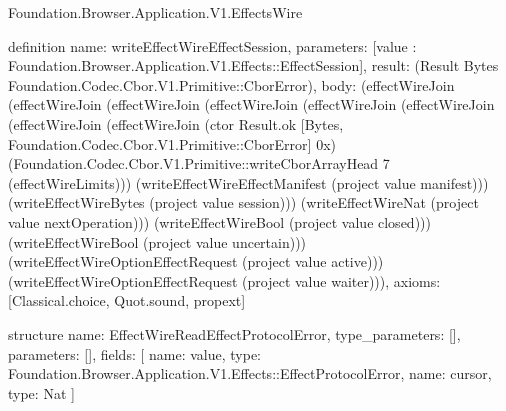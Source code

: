 \begin{lexlean}{Foundation.Browser.Application.V1.EffectsWire}
\begin{semanticmodule}
definition{
  name: writeEffectWireEffectSession,
  parameters: [value : Foundation.Browser.Application.V1.Effects::EffectSession],
  result: (Result Bytes Foundation.Codec.Cbor.V1.Primitive::CborError),
  body: (effectWireJoin (effectWireJoin (effectWireJoin (effectWireJoin (effectWireJoin (effectWireJoin (effectWireJoin (effectWireJoin (ctor Result.ok [Bytes, Foundation.Codec.Cbor.V1.Primitive::CborError] 0x) (Foundation.Codec.Cbor.V1.Primitive::writeCborArrayHead 7 (effectWireLimits))) (writeEffectWireEffectManifest (project value manifest))) (writeEffectWireBytes (project value session))) (writeEffectWireNat (project value nextOperation))) (writeEffectWireBool (project value closed))) (writeEffectWireBool (project value uncertain))) (writeEffectWireOptionEffectRequest (project value active))) (writeEffectWireOptionEffectRequest (project value waiter))),
  axioms: [Classical.choice, Quot.sound, propext]
}

structure{
  name: EffectWireReadEffectProtocolError,
  type_parameters: [],
  parameters: [],
  fields: [
    {name: value, type: Foundation.Browser.Application.V1.Effects::EffectProtocolError},
    {name: cursor, type: Nat}
  ]
}


\end{semanticmodule}
\end{lexlean}
